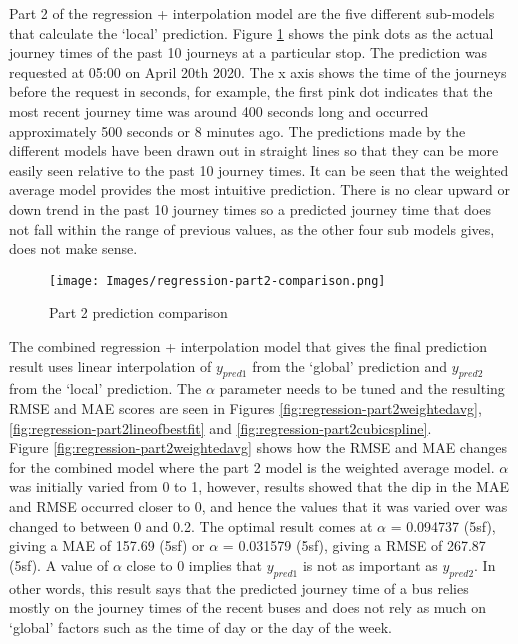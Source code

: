 Part 2 of the regression + interpolation model are the five different sub-models that calculate the `local' prediction. Figure \ref{fig:part2-comparison} shows the pink dots as the actual journey times of the past 10 journeys at a particular stop. The prediction was requested at 05:00 on April 20th 2020. The x axis shows the time of the journeys before the request in seconds, for example, the first pink dot indicates that the most recent journey time was around 400 seconds long and occurred approximately 500 seconds or 8 minutes ago. The predictions made by the different models have been drawn out in straight lines so that they can be more easily seen relative to the past 10 journey times. It can be seen that the weighted average model provides the most intuitive prediction. There is no clear upward or down trend in the past 10 journey times so a predicted journey time that does not fall within the range of previous values, as the other four sub models gives, does not make sense.

\begin{figure}[H]
\begin{center}
    \texttt{[image: Images/regression-part2-comparison.png]}
    \caption{Part 2 prediction comparison}
    \label{fig:part2-comparison}
\end{center}
\end{figure}

The combined regression + interpolation model that gives the final prediction result uses linear interpolation of $y_{pred1}$ from the `global' prediction and $y_{pred2}$ from the `local' prediction. The $\alpha$ parameter needs to be tuned and the resulting RMSE and MAE scores are seen in Figures \ref{fig:regression-part2weightedavg}, \ref{fig:regression-part2lineofbestfit} and \ref{fig:regression-part2cubicspline}. \\

Figure \ref{fig:regression-part2weightedavg} shows how the RMSE and MAE changes for the combined model where the part 2 model is the weighted average model. $\alpha$ was initially varied from 0 to 1, however, results showed that the dip in the MAE and RMSE occurred closer to 0, and hence the values that it was varied over was changed to between 0 and 0.2. The optimal result comes at $\alpha$ = 0.094737 (5sf), giving a MAE of 157.69 (5sf) or $\alpha$ = 0.031579 (5sf), giving a RMSE of 267.87 (5sf). A value of $\alpha$ close to 0 implies that $y_{pred1}$ is not as important as $y_{pred2}$. In other words, this result says that the predicted journey time of a bus relies mostly on the journey times of the recent buses and does not rely as much on `global' factors such as the time of day or the day of the week.

